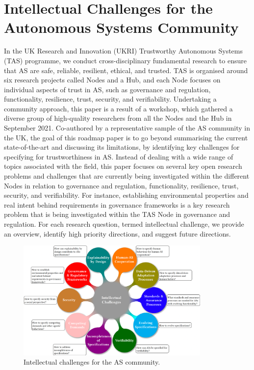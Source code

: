 \documentclass[sigconf,nonacm]{acmart}%
\begin{document}
	\section{Intellectual Challenges for the Autonomous Systems Community}\label{as-challenges}
In the UK Research and Innovation (UKRI) Trustworthy Autonomous Systems (TAS) programme, we conduct cross-disciplinary fundamental research to ensure that AS are safe, reliable, resilient, ethical, and trusted. 
TAS is organised around six research projects called Nodes and a Hub, and each Node focuses on individual aspects of trust in AS, such as governance and regulation, functionality, resilience, trust, security, and verifiability. 
Undertaking a community approach, this paper is a result of a workshop, which gathered a diverse group of high-quality researchers from all the Nodes and the Hub in September 2021. 
Co-authored by a representative sample of the AS community in the UK, the goal of this roadmap paper is to go beyond summarising the current state-of-the-art and discussing its limitations, by identifying key challenges for specifying for trustworthiness in AS. 
Instead of dealing with a wide range of topics associated with the field, this paper focuses on several key open research problems and challenges that are currently being investigated within the different Nodes in relation to governance and regulation, functionality, resilience, trust, security, and verifiability. 
For instance, establishing environmental properties and real intent behind requirements in governance frameworks is a key research problem that is being investigated within the TAS Node in governance and regulation. 
For each research question, termed intellectual challenge, we provide an overview, identify high priority directions, and suggest future directions.	
	
	\begin{figure}
		\centering
		\includegraphics[width=0.85\textwidth]{figures/Intellectual-Challenges.png}%
		\caption{Intellectual challenges for the AS community.}
		\label{Intellectual-challenges}
	\end{figure}		
	
\end{document}
